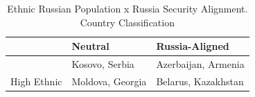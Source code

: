 \begin{table}[t]
\caption{\label{tab:07}Ethnic Russian Population x Russia Security Alignment. Country Classification}
\fontsize{12.0pt}{14.0pt}\selectfont
\begin{tabular*}{\linewidth}{@{\extracolsep{\fill}}lll}
\toprule
 & Neutral & Russia-Aligned \\ 
\midrule\addlinespace[2.5pt]
{Low Ethnic} & {Kosovo, Serbia} & {Azerbaijan, Armenia} \\ 
{High Ethnic} & {Moldova, Georgia} & {Belarus, Kazakhstan} \\ 
\bottomrule
\end{tabular*}
\end{table}

